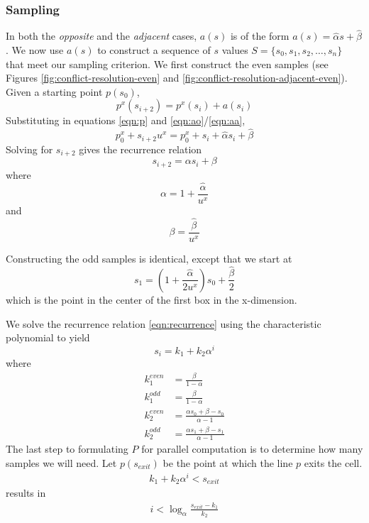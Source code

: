 \documentclass{egpubl}
\begin{document}
\subsubsection{Sampling}
In both the \textit{opposite} and the \textit{adjacent} cases, $a(s)$ is of the form $a(s) = \hat{\alpha} s + \hat{\beta}$. We now use $a(s)$ to construct a sequence of $s$ values $S = \{s_0, s_1, s_2, \dots, s_n\}$ that meet our sampling criterion. We first construct the even samples (see Figures \ref{fig:conflict-resolution-even} and \ref{fig:conflict-resolution-adjacent-even}). Given a starting point $p(s_0)$,
\begin{equation}
p^x(s_{i+2}) = p^x(s_i) + a(s_i)
\end{equation}
Substituting in equations \eqref{eqn:p} and \eqref{eqn:ao}/\eqref{eqn:aa},
\begin{equation}
p_0^x + s_{i+2}u^x = p_0^x + s_i + \hat{\alpha} s_i + \hat{\beta}
\end{equation}
Solving for $s_{i+2}$ gives the recurrence relation
\begin{equation}
s_{i+2} = \alpha s_i + \beta \label{eqn:recurrence}
\end{equation}
where
\begin{equation}
\alpha = 1 + \frac{\hat{\alpha}}{u^x}
\end{equation}
and
\begin{equation}
\beta = \frac{\hat{\beta}}{u^x}
\end{equation}

Constructing the odd samples is identical, except that we start at
\begin{equation}
s_1 = \left(1+\frac{\hat{\alpha}}{2u^x}\right)s_0 + \frac{\hat{\beta}}{2}
\end{equation}
which is the point in the center of the first box in the x-dimension.

We solve the recurrence relation \eqref{eqn:recurrence} using the characteristic polynomial to yield
\begin{equation}
s_i = k_1 + k_2 \alpha^i
\end{equation}
where
\begin{align}
k_1^{even} &= \frac{\beta}{1-\alpha} \\
k_1^{odd} &= \frac{\beta}{1-\alpha} \\
k_2^{even} &= \frac{\alpha s_0 + \beta - s_0}{\alpha-1} \\
k_2^{odd} &= \frac{\alpha s_1 + \beta - s_1}{\alpha-1}
\end{align}
The last step to formulating $P$ for parallel computation is to determine how many samples we will need. Let $p(s_{exit})$ be the point at which the line $p$ exits the cell.
\begin{align}
k_1+k_2\alpha^i < s_{exit}
\end{align}
results in
\begin{align}
i < \log_{\alpha}\frac{s_{exit}-k_1}{k_2}
\end{align}
\end{document}
